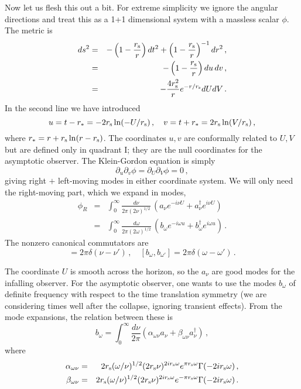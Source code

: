 \documentclass[12pt]{article}
\newcommand{\be}{\begin{equation}}
\newcommand{\ee}{\end{equation}}
\newcommand{\bea}{\begin{eqnarray}}
\newcommand{\eea}{\end{eqnarray}}
\newcommand{\rmx}{\rm}
\newcommand{\rs}{r_{\rmx s}}
\begin{document}
Now let us flesh this out a bit.  For extreme simplicity we ignore the angular directions and treat this as a 1+1 dimensional system with a massless scalar $\phi$.  The metric is
\bea
ds^2 &=& - \left( 1 - \frac{r_{\rmx s} }{r} \right) dt^2 +\left( 1 - \frac{r_{\rmx s} }{r} \right)^{-1} dr^2  \,, \nonumber\\
 &=& - \left( 1 - \frac{r_{\rmx s} }{r} \right) du\, dv  \,, \nonumber\\
&=& -\frac{4 r_{\rmx s}^2}{r} e^{-r/r_{\rmx s}} dU dV \,.
\eea
In the second line we have introduced 
\be
u = t-r_* = -2\rs \ln (-U/\rs)\,,\quad v= t+r_* = 2\rs\ln (V/\rs)\,,
\ee
where $r_* = r + \rs \ln(r-\rs)$.  The coordinates $u,v$ are conformally related to $U,V$ but are defined only in quadrant I; they are the null coordinates for the asymptotic observer.  The Klein-Gordon equation is simply 
\be
\partial_u \partial_v \phi = \partial_U \partial_V \phi = 0  \,,
\ee
giving right $+$ left-moving modes in either coordinate system.
We will only need the right-moving part, which we expand in modes,
\bea
 \phi_{R} &=& \int_{0}^\infty \frac{d\nu}{2\pi(2\nu)^{1/2}}\, \left( a_\nu e^{-i\nu U} +a_\nu^\dagger e^{i\nu U} \right) \nonumber\\
&=& \int_{0}^\infty \frac{d\omega}{2\pi(2\omega)^{1/2}}\, \left( b_\omega e^{-i\omega u} +b_\omega^\dagger e^{i\omega u} \right)   \,.
\eea
The nonzero canonical commutators are
\be
[ a_\nu, a_{\nu'} ] = 2\pi \delta(\nu-\nu')\,,\quad [ b_\omega, b_{\omega'} ] = 2\pi \delta(\omega-\omega') \,.
\ee

The coordinate $U$ is smooth across the horizon, so the $a_\nu$ are good modes for the infalling observer.  For the asymptotic observer, one wants to use the modes $b_\omega$ of definite frequency with respect to the time translation symmetry (we are considering times well after the collapse,  ignoring transient effects).  From the mode expansions, the relation between these is 
\be
b_\omega = \int_{0}^\infty \frac{d\nu}{2\pi}\left( \alpha_{\omega\nu} a_\nu +  \beta_{\omega\nu} a_\nu^\dagger \right)\,, \label{atob}
\ee
where
\bea
\alpha_{\omega\nu} &=& 2\rs (\omega/\nu)^{1/2} (2 \rs\nu)^{2i  \rs \omega} e^{\pi  \rs \omega} \Gamma(- 2i  \rs \omega) \,, \nonumber\\
\beta_{\omega\nu} &=& 2\rs (\omega/\nu)^{1/2}  (2 \rs\nu)^{2i  \rs \omega} e^{-\pi  \rs \omega} \Gamma(- 2i  \rs \omega) \,.
\eea
\end{document}
